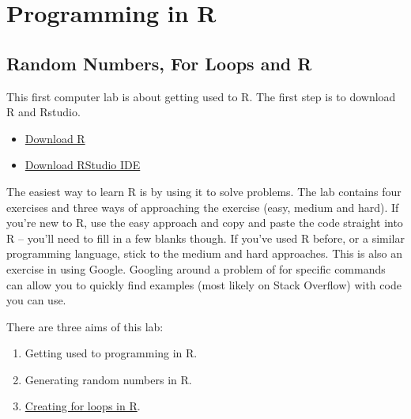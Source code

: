 \documentclass[
]{book}
\providecommand{\tightlist}{%
  \setlength{\itemsep}{0pt}\setlength{\parskip}{0pt}}
\theoremstyle{definition}
\theoremstyle{definition}
\theoremstyle{definition}
\theoremstyle{definition}
\theoremstyle{remark}
\begin{document}
\hypertarget{programming-in-r}{%
\chapter{Programming in R}\label{programming-in-r}}

\hypertarget{random-numbers-for-loops-and-r}{%
\section{Random Numbers, For Loops and R}\label{random-numbers-for-loops-and-r}}

This first computer lab is about getting used to R. The first step is to download R and Rstudio.

\begin{itemize}
\tightlist
\item
  \href{https://www.r-project.org}{Download R}
\item
  \href{https://posit.co/downloads/}{Download RStudio IDE}
\end{itemize}

The easiest way to learn R is by using it to solve problems. The lab contains four exercises and three ways of approaching the exercise (easy, medium and hard). If you're new to R, use the easy approach and copy and paste the code straight into R -- you'll need to fill in a few blanks though. If you've used R before, or a similar programming language, stick to the medium and hard approaches. This is also an exercise in using Google. Googling around a problem of for specific commands can allow you to quickly find examples (most likely on Stack Overflow) with code you can use.

There are three aims of this lab:

\begin{enumerate}
\def\labelenumi{\arabic{enumi}.}
\tightlist
\item
  Getting used to programming in R.
\item
  Generating random numbers in R.
\item
  \href{https://www.w3schools.com/r/r_for_loop.asp}{Creating for loops in R}.
\end{enumerate}
\end{document}
